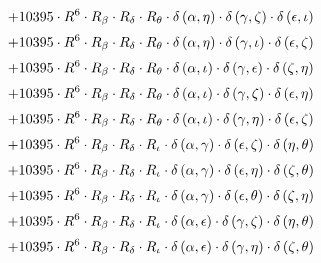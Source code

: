 \begin{subequations}
\begin{gather}
 \\[0.2em] \notag 		 + 10395 \cdot R^{6} \cdot R_{\beta{}} \cdot R_{\delta{}} \cdot R_{\theta{}} \cdot \delta{}\left(\alpha{}, \eta{}\right) \cdot \delta{}\left(\gamma{}, \zeta{}\right) \cdot \delta{}\left(\epsilon{}, \iota{}\right) 
 \\[0.2em] \notag 		 + 10395 \cdot R^{6} \cdot R_{\beta{}} \cdot R_{\delta{}} \cdot R_{\theta{}} \cdot \delta{}\left(\alpha{}, \eta{}\right) \cdot \delta{}\left(\gamma{}, \iota{}\right) \cdot \delta{}\left(\epsilon{}, \zeta{}\right) 
 \\[0.2em] \notag 		 + 10395 \cdot R^{6} \cdot R_{\beta{}} \cdot R_{\delta{}} \cdot R_{\theta{}} \cdot \delta{}\left(\alpha{}, \iota{}\right) \cdot \delta{}\left(\gamma{}, \epsilon{}\right) \cdot \delta{}\left(\zeta{}, \eta{}\right) 
 \\[0.2em] \notag 		 + 10395 \cdot R^{6} \cdot R_{\beta{}} \cdot R_{\delta{}} \cdot R_{\theta{}} \cdot \delta{}\left(\alpha{}, \iota{}\right) \cdot \delta{}\left(\gamma{}, \zeta{}\right) \cdot \delta{}\left(\epsilon{}, \eta{}\right) 
 \\[0.2em] \notag 		 + 10395 \cdot R^{6} \cdot R_{\beta{}} \cdot R_{\delta{}} \cdot R_{\theta{}} \cdot \delta{}\left(\alpha{}, \iota{}\right) \cdot \delta{}\left(\gamma{}, \eta{}\right) \cdot \delta{}\left(\epsilon{}, \zeta{}\right) 
 \\[0.2em] \notag 		 + 10395 \cdot R^{6} \cdot R_{\beta{}} \cdot R_{\delta{}} \cdot R_{\iota{}} \cdot \delta{}\left(\alpha{}, \gamma{}\right) \cdot \delta{}\left(\epsilon{}, \zeta{}\right) \cdot \delta{}\left(\eta{}, \theta{}\right) 
 \\[0.2em] \notag 		 + 10395 \cdot R^{6} \cdot R_{\beta{}} \cdot R_{\delta{}} \cdot R_{\iota{}} \cdot \delta{}\left(\alpha{}, \gamma{}\right) \cdot \delta{}\left(\epsilon{}, \eta{}\right) \cdot \delta{}\left(\zeta{}, \theta{}\right) 
 \\[0.2em] \notag 		 + 10395 \cdot R^{6} \cdot R_{\beta{}} \cdot R_{\delta{}} \cdot R_{\iota{}} \cdot \delta{}\left(\alpha{}, \gamma{}\right) \cdot \delta{}\left(\epsilon{}, \theta{}\right) \cdot \delta{}\left(\zeta{}, \eta{}\right) 
 \\[0.2em] \notag 		 + 10395 \cdot R^{6} \cdot R_{\beta{}} \cdot R_{\delta{}} \cdot R_{\iota{}} \cdot \delta{}\left(\alpha{}, \epsilon{}\right) \cdot \delta{}\left(\gamma{}, \zeta{}\right) \cdot \delta{}\left(\eta{}, \theta{}\right) 
 \\[0.2em] \notag 		 + 10395 \cdot R^{6} \cdot R_{\beta{}} \cdot R_{\delta{}} \cdot R_{\iota{}} \cdot \delta{}\left(\alpha{}, \epsilon{}\right) \cdot \delta{}\left(\gamma{}, \eta{}\right) \cdot \delta{}\left(\zeta{}, \theta{}\right) 

\end{gather}
\end{subequations}
